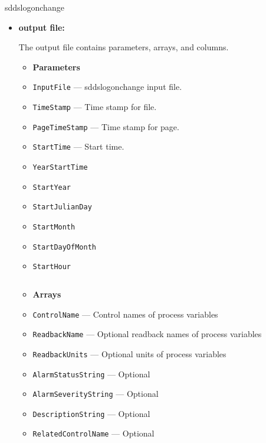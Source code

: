 \begin{sddsprog}{sddslogonchange}
\begin{itemize}
\item {\bf output file:}\par
The output file contains parameters, arrays, and columns.
\begin{itemize}
        \item {\bf Parameters}
        \item {\tt InputFile} --- sddslogonchange input file.
        \item {\tt TimeStamp} --- Time stamp for file.
        \item {\tt PageTimeStamp} --- Time stamp for page.
        \item {\tt StartTime} --- Start time.
        \item {\tt YearStartTime}
        \item {\tt StartYear}
        \item {\tt StartJulianDay}
        \item {\tt StartMonth}
        \item {\tt StartDayOfMonth}
        \item {\tt StartHour}
\end{itemize}
\begin{verbatim}

\end{verbatim}
\begin{itemize}
        \item {\bf Arrays}
        \item {\tt ControlName} --- Control names of process variables
        \item {\tt ReadbackName} --- Optional readback names of process variables
        \item {\tt ReadbackUnits} --- Optional units of process variables
        \item {\tt AlarmStatusString} --- Optional
        \item {\tt AlarmSeverityString} --- Optional
        \item {\tt DescriptionString} --- Optional
        \item {\tt RelatedControlName} --- Optional
\end{itemize}
\begin{verbatim}


\end{verbatim}
\end{itemize}
\end{sddsprog}
